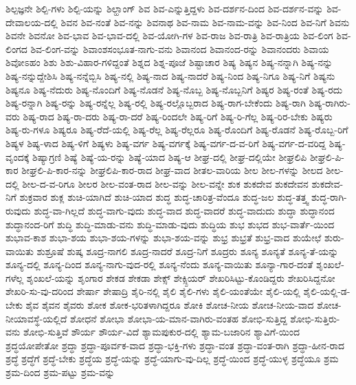 {ಶಿಲ್ಪಜ್ಞನೇ
ಶಿಲ್ಪಿ-ಗಳು
ಶಿಲ್ಪಿ-ಯನ್ನು
ಶಿಲ್ಹಾಂಗ್
ಶಿವ
ಶಿವ-ಎನ್ನುತ್ತಿದ್ದಳು
ಶಿವ-ದರ್ಶನ-ದಿಂದ
ಶಿವ-ದರ್ಶನ-ವನ್ನು
ಶಿವ-ದೇವಾಲಯ-ದಲ್ಲಿ
ಶಿವನ
ಶಿವ-ನಂತೆ
ಶಿವ-ನನ್ನು
ಶಿವನಾಥ
ಶಿವ-ನಾಮ
ಶಿವ-ನಾಮ-ವನ್ನು
ಶಿವ-ನಿಂದ
ಶಿವ-ನಿಗೆ
ಶಿವನು
ಶಿವನೇ
ಶಿವನೋ
ಶಿವ-ಭಾವ
ಶಿವ-ಭಾವ-ದಲ್ಲಿ
ಶಿವ-ಯೋಗಿ-ಗಳ
ಶಿವ-ರಾಜ
ಶಿವ-ರಾತ್ರಿ
ಶಿವ-ರಾತ್ರಿಯ
ಶಿವ-ಲಿಂಗ
ಶಿವ-ಲಿಂಗದ
ಶಿವ-ಲಿಂಗ-ವನ್ನು
ಶಿವಾಂಶಸಂಭೂತ-ನಾಗು-ವನು
ಶಿವಾನಂದ
ಶಿವಾನಂದ-ರನ್ನು
ಶಿವಾನಂದರು
ಶಿವಾಯ
ಶಿವೋಽಹಂ
ಶಿಶು
ಶಿಶು-ವಿಹಾರ-ಗಳಿದ್ದಂತೆ
ಶಿಶ್ನದ
ಶಿಶ್ನ-ಪೂಜೆ
ಶಿಷ್ಟಾಚಾರ
ಶಿಷ್ಯ
ಶಿಷ್ಯನ
ಶಿಷ್ಯ-ನನ್ನಾಗಿ
ಶಿಷ್ಯ-ನನ್ನು
ಶಿಷ್ಯ-ನನ್ನುದ್ದೇಶಿಸಿ
ಶಿಷ್ಯ-ನನ್ನೆಬ್ಬಿಸಿ
ಶಿಷ್ಯ-ನಲ್ಲಿ
ಶಿಷ್ಯ-ನಾದ
ಶಿಷ್ಯ-ನಾದರೆ
ಶಿಷ್ಯ-ನಿಂದ
ಶಿಷ್ಯ-ನಿಗೂ
ಶಿಷ್ಯ-ನಿಗೆ
ಶಿಷ್ಯನು
ಶಿಷ್ಯನೂ
ಶಿಷ್ಯ-ನೆದುರು
ಶಿಷ್ಯ-ನೊಂದಿಗೆ
ಶಿಷ್ಯ-ನೊಡನೆ
ಶಿಷ್ಯ-ನೊಬ್ಬ
ಶಿಷ್ಯ-ನೊಬ್ಬನಿಗೆ
ಶಿಷ್ಯರ
ಶಿಷ್ಯ-ರಂತೆ
ಶಿಷ್ಯ-ರದು
ಶಿಷ್ಯ-ರನ್ನಾಗಿ
ಶಿಷ್ಯ-ರನ್ನು
ಶಿಷ್ಯ-ರನ್ನೆಲ್ಲ
ಶಿಷ್ಯ-ರಲ್ಲಿ
ಶಿಷ್ಯ-ರಲ್ಲೊಬ್ಬರಾದ
ಶಿಷ್ಯ-ರಾಗ-ಬೇಕೆಂದು
ಶಿಷ್ಯ-ರಾಗಿ
ಶಿಷ್ಯ-ರಾಗಿರು-ವರು
ಶಿಷ್ಯ-ರಾದ
ಶಿಷ್ಯ-ರಾ-ದರು
ಶಿಷ್ಯ-ರಾ-ದರೆ
ಶಿಷ್ಯ-ರಿಂದಲೇ
ಶಿಷ್ಯ-ರಿಗೆ
ಶಿಷ್ಯ-ರಿ-ಗೆಲ್ಲ
ಶಿಷ್ಯ-ರಿರ-ಬೇಕು
ಶಿಷ್ಯರು
ಶಿಷ್ಯ-ರು-ಗಳೂ
ಶಿಷ್ಯರೂ
ಶಿಷ್ಯ-ರೆದೆ-ಯಲ್ಲಿ
ಶಿಷ್ಯ-ರೆಲ್ಲ
ಶಿಷ್ಯ-ರೆಲ್ಲರೂ
ಶಿಷ್ಯ-ರೊಂದಿಗೆ
ಶಿಷ್ಯ-ರೊಡನೆ
ಶಿಷ್ಯ-ರೊಬ್ಬ-ರಿಗೆ
ಶಿಷ್ಯಳ
ಶಿಷ್ಯ-ಳಾದ
ಶಿಷ್ಯ-ಳಿಗೆ
ಶಿಷ್ಯಳು
ಶಿಷ್ಯ-ವರ್ಗ
ಶಿಷ್ಯ-ವರ್ಗಕ್ಕೆ
ಶಿಷ್ಯ-ವರ್ಗ-ದ-ವ-ರಿಗೆ
ಶಿಷ್ಯ-ವರ್ಗ-ದ-ವರಿದ್ದ
ಶಿಷ್ಯ-ವೃಂದಕ್ಕೆ
ಶಿಷ್ಯಾಗ್ರಣಿ
ಶಿಷ್ಯೆ
ಶಿಷ್ಯೆ-ಯ-ರನ್ನು
ಶಿಷ್ಯೆ-ಯಾದ
ಶಿಷ್ಯ-ಆ
ಶೀಘ್ರ-ದಲ್ಲಿ
ಶೀಘ್ರ-ದಲ್ಲಿಯೇ
ಶೀಘ್ರಲಿಪಿ
ಶೀಘ್ರಲಿ-ಪಿ-ಕಾರ
ಶೀಘ್ರಲಿ-ಪಿ-ಕಾರ-ನನ್ನು
ಶೀಘ್ರಲಿಪಿ-ಕಾರ-ರಾದ
ಶೀಘ್ರ-ವಾದ
ಶೀತಲ-ವಾರಿಯ
ಶೀಲ
ಶೀಲ-ಗಳನ್ನು
ಶೀಲದ
ಶೀಲ-ದಲ್ಲಿ
ಶೀಲ-ದ-ವ-ರಿಗೂ
ಶೀಲರ
ಶೀಲ-ವಂತ-ರಾದ
ಶೀಲ-ವನ್ನು
ಶೀಲ-ವನ್ನೇ
ಶುಕ
ಶುಕದೇವ
ಶುಕದೇವನ
ಶುಕದೇವ-ನಿಗೆ
ಶುಕ್ರವಾರ
ಶುಕ್ಲ
ಶುಚಿ-ಯಾಗಿದೆ
ಶುಚಿ-ಯಾದ
ಶುದ್ಧ
ಶುದ್ಧ-ಚಾರಿತ್ರ-ವೆಂದೂ
ಶುದ್ಧ-ಜಲ
ಶುದ್ಧ-ತತ್ತ್ವ
ಶುದ್ಧ-ರಾಗಿ-ರುವುದು
ಶುದ್ಧ-ವಾ-ಗಿಲ್ಲದೆ
ಶುದ್ಧ-ವಾಗು-ವುದು
ಶುದ್ಧ-ವಾದ
ಶುದ್ಧ-ವಾದರೆ
ಶುದ್ಧ-ವಾದುದು
ಶುದ್ಧಾ
ಶುದ್ಧಾನಂದ
ಶುದ್ಧಾನಂದ-ರಿಗೆ
ಶುದ್ಧಿ
ಶುದ್ಧಿ-ಮಾಡು-ವನು
ಶುದ್ಧಿ-ಮಾಡು-ವುದು
ಶುದ್ಧಿಯ
ಶುಭ
ಶುಭದ
ಶುಭ-ವಾರ್ತೆ-ಯಿಂದ
ಶುಭಾವ-ಕಾಶ
ಶುಭಾ-ಶಯ
ಶುಭಾ-ಶಯ-ಗಳನ್ನು
ಶುಭಾ-ಶಯ-ವನ್ನು
ಶುಭ್ರ
ಶುಭ್ರತೆ
ಶುಭ್ರ-ವಾದ
ಶುಯೇಛೆ
ಶುರು-ವಾಯಿತು
ಶುಶ್ರೂಷೆ
ಶುಷ್ಕ
ಶೂದ್ರ-ನಾಗಲಿ
ಶೂದ್ರ-ನಾದರೆ
ಶೂದ್ರ-ನಿಗೆ
ಶೂದ್ರರು
ಶೂನ್ಯ
ಶೂನ್ಯತೆ
ಶೂನ್ಯ-ತೆ-ಯನ್ನು
ಶೂನ್ಯ-ದಲ್ಲಿ
ಶೂನ್ಯ-ದಿಂದ
ಶೂನ್ಯ-ನಾಗು-ವುದ-ರಲ್ಲಿ
ಶೂನ್ಯ-ನೆಂದು
ಶೂನ್ಯ-ವಾಯಿತು
ಶೂನ್ಯಾ-ಗಾರ-ದಂತೆ
ಶೃಂಖಲೆ-ಗಳೆಲ್ಲ
ಶೃಂಖಲೆ-ಯನ್ನು
ಶೃಂಗಾರ
ಶೇಕಡ
ಶೇಕಡಾ
ಶೇಕ್ಸ್
ಶೇಕ್ಸ್ಪಿಯರ್
ಶೇಖರಿಸಿಟ್ಟು-ಕೊಂಡಿದ್ದರು
ಶೇಖರಿಸಿದ್ದನೋ
ಶೇಖರಿ-ಸು-ವು-ದರಿಂದ
ಶೇರ್ಷಾ
ಶೇಷಾದ್ರಿ
ಶೈರಿ-ನಲ್ಲಿ
ಶೈಲಿ
ಶೈಲಿ-ಗಳು
ಶೈಲಿ-ಯಂತೆಯೇ
ಶೈಲಿ-ಯಲ್ಲಿ
ಶೈಲಿ-ಯಲ್ಲಿ-ಡ-ಬೇಕು
ಶೈವ
ಶೈವನ
ಶೈವರು
ಶೋಕ
ಶೋಕ-ಭರಿತಳಾಗಿದ್ದರೂ
ಶೋಕಿ
ಶೋಚ-ನೀಯ
ಶೋಚ-ನೀಯ-ವಾದ
ಶೋಚ-ನೀಯಾವಸ್ಥೆ-ಯಲ್ಲಿದೆ
ಶೋಧನೆ
ಶೋಭಾ
ಶೋಭಾ-ಯ-ಮಾನ-ವಾಗಿರು-ವಂತಹ
ಶೋಭಿ-ಸುತ್ತಿದ್ದ
ಶೋಭಿ-ಸುತ್ತಿರು-ವನು
ಶೋಭಿ-ಸುತ್ತಿವೆ
ಶೌರ್ಯ
ಶೌರ್ಯ-ವಿದೆ
ಶ್ಯಾಮಪುಕುರ-ದಲ್ಲಿ
ಶ್ಯಾಮ-ಬಜಾರಿನ
ಶ್ಯಾವಿಗೆ-ಯಿಂದ
ಶ್ರದ್ಧಯೋಪೇತೋ
ಶ್ರದ್ಧಾ
ಶ್ರದ್ಧಾ-ಪೂರ್ವಕ-ವಾದ
ಶ್ರದ್ಧಾ-ಭಕ್ತಿ-ಗಳು
ಶ್ರದ್ಧಾ-ವಂತ
ಶ್ರದ್ಧಾ-ವಂತ-ರಾಗಿ
ಶ್ರದ್ಧಾ-ಹೀನ-ರಾದ
ಶ್ರದ್ಧೆ
ಶ್ರದ್ಧೆಗೆ
ಶ್ರದ್ಧೆ-ಬೇಕು
ಶ್ರದ್ಧೆಯ
ಶ್ರದ್ಧೆ-ಯನ್ನು
ಶ್ರದ್ಧೆ-ಯಾಗು-ವು-ದಿಲ್ಲ
ಶ್ರದ್ಧೆ-ಯಿಂದ
ಶ್ರದ್ಧೆ-ಯುಳ್ಳ
ಶ್ರದ್ಧೆಯೂ
ಶ್ರಮ
ಶ್ರಮ-ದಿಂದ
ಶ್ರಮ-ಪಟ್ಟು
ಶ್ರಮ-ವನ್ನು
}
